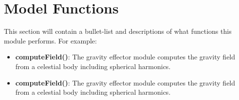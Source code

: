\section{Model Functions}
This section will contain a bullet-list and descriptions of what functions this module performs. For example:
\begin{itemize}
	\item \textbf{computeField()}: The gravity effector module computes the gravity field from a celestial body including spherical harmonics.
	\item \textbf{computeField()}: The gravity effector module computes the gravity field from a celestial body including spherical harmonics.
\end{itemize}